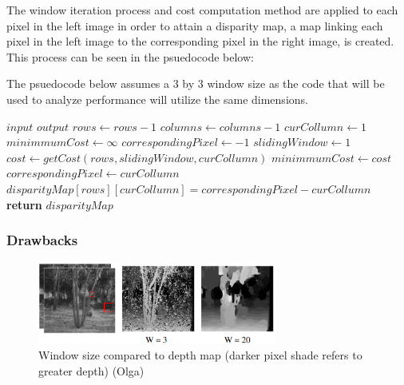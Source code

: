 \documentclass[11pt]{scrartcl}
\begin{document}
The window iteration process and cost computation method are applied to each pixel in the 
left image in order to attain a disparity map, a map linking each pixel in the left image 
to the corresponding pixel in the right image, is created. This process can be seen in the 
psuedocode below:
\begin{remark}
	The psuedocode below assumes a 3 by 3 window size as the code that will 
	be used to analyze performance will utilize the same dimensions. 
\end{remark}
\begin{algorithm}[!htb]
	\algrenewcommand{}
	\algrenewcommand{}
	\caption{}
	\label{alg:}
	\begin{algorithmic}[1]
		\Require $input$
		\Ensure $output$ 
		\State $rows \gets rows-1$
		\State $columns \gets columns-1$
		\State $curCollumn \gets 1$
		\State $minimmumCost \gets \infty$
		\State $correspondingPixel \gets -1$
		\State $slidingWindow \gets 1$
		\State $cost \gets getCost(rows, slidingWindow, curCollumn)$
		\State $minimmumCost \gets cost$
		\State $correspondingPixel \gets curCollumn$
		\EndIf
		\EndWhile
		\EndWhile 
		\State $disparityMap[rows][curCollumn] = correspondingPixel - curCollumn$
		\EndWhile
		\State \textbf{return} $disparityMap$
	\end{algorithmic}
\end{algorithm}

\subsubsection{Drawbacks}
\begin{figure}
	\includegraphics[width=0.7\textwidth]{winsize.png}
	\caption{\label{fig:frog1} Window size compared to depth map (darker pixel shade refers to greater depth) (Olga)}
	
\end{figure}
\end{document}
